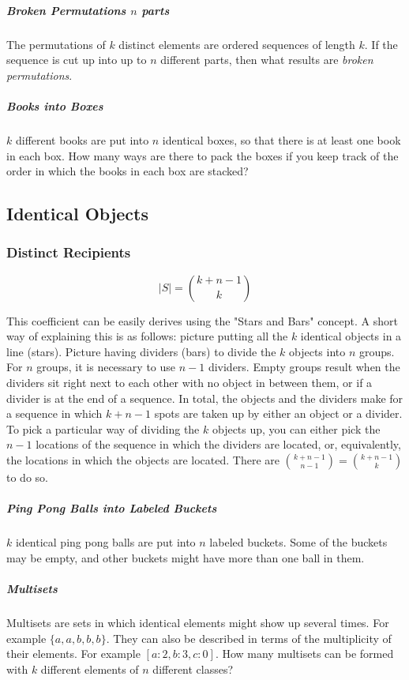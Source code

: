 \subparagraph{Broken Permutations $n$ parts} The permutations of $k$ distinct elements are ordered sequences of length $k$. If the sequence is cut up into up to $n$ different parts, then what results are \textit{broken permutations}.

\subparagraph{Books into Boxes} $k$ different books are put into $n$ identical boxes, so that there is at least one book in each box. How many ways are there to pack the boxes if you keep track of the order in which the books in each box are stacked? 


\subsection{Identical Objects}

\subsubsection{Distinct Recipients}

\begin{equation}
|S| = {k+n-1 \choose k}
\end{equation}

This coefficient can be easily derives using the "Stars and Bars" concept. A short way of explaining this is as follows: picture putting all the $k$ identical objects in a line (stars). Picture having dividers (bars) to divide the $k$ objects into $n$ groups. For $n$ groups, it is necessary to use $n-1$ dividers. Empty groups result when the dividers sit right next to each other with no object in between them, or if a divider is at the end of a sequence. In total, the objects and the dividers make for a sequence in which $k+n-1$ spots are taken up by either an object or a divider. To pick a particular way of dividing the $k$ objects up, you can either pick the $n-1$ locations of the sequence in which the dividers are located, or, equivalently, the locations in which the objects are located. There are ${k+n-1\choose n-1}={k+n-1\choose k}$ to do so.  

\subparagraph{Ping Pong Balls into Labeled Buckets} $k$ identical ping pong balls are put into $n$ labeled buckets. Some of the buckets may be empty, and other buckets might have more than one ball in them.  

\subparagraph{Multisets} Multisets are sets in which identical elements might show up several times. For example $\{a,a,b,b,b\}$. They can also be described in terms of the multiplicity of their elements. For example $[a:2, b:3, c:0]$. How many multisets can be formed with $k$ different elements of $n$ different classes?

